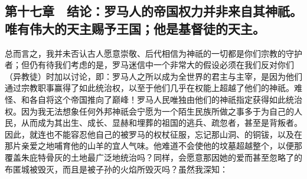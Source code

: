 
\subsection{第十七章　结论：罗马人的帝国权力并非来自其神祇。唯有伟大的天主赐予王国；他是基督徒的天主。}

总而言之，我并未否认古人愿意崇敬、后代相信为神祇的一切都是你们宗教的守护者；但仍有待我们考虑的是，罗马迷信中一个非常大的假设必须在我们反对你们（异教徒）时加以讨论，即：罗马人之所以成为全世界的君主与主宰，是因为他们通过宗教职事赢得了如此统治权，以至于他们几乎在权能上超越了他们的神祇。难怪、和各自将这个帝国推向了巅峰！罗马人民唯独由他们的神祇指定获得如此统治权。因为我无法想象任何外邦神祇会宁愿为一个陌生民族所做之事多于为自己的人民，从而成为其出生、成长、显赫和埋葬的祖国的逃兵、疏忽者，甚至是背叛者。因此，就连也不能容忍他自己的被罗马的权杖征服，忘记那山洞、的铜钹，以及在那片亲爱之地哺育他的山羊的宜人气味。他难道不会使他的坟墓超越整个，以便那覆盖朱庇特骨灰的土地最广泛地统治吗？同样，会愿意那因她的爱而甚至忽略了的布匿城被毁灭，而且是被子孙的火焰所毁灭吗？虽然我深知：\par

\par

\par


